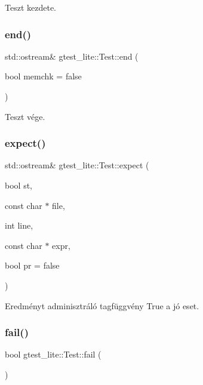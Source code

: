 Teszt kezdete. 

\mbox{\label{structgtest__lite_1_1_test_a658c1eee35f170294c354ebf4d3fc1ba}} 
\subsubsection{end()}
{\footnotesize\ttfamily std\+::ostream\& gtest\+\_\+lite\+::\+Test\+::end (\begin{DoxyParamCaption}\item[{bool}]{memchk = {\ttfamily false} }\end{DoxyParamCaption})\hspace{0.3cm}{\ttfamily [inline]}}



Teszt vége. 

\mbox{\label{structgtest__lite_1_1_test_a0bca03315e5963f7fdfffd92d2daed6a}} 
\subsubsection{expect()}
{\footnotesize\ttfamily std\+::ostream\& gtest\+\_\+lite\+::\+Test\+::expect (\begin{DoxyParamCaption}\item[{bool}]{st,  }\item[{const char $\ast$}]{file,  }\item[{int}]{line,  }\item[{const char $\ast$}]{expr,  }\item[{bool}]{pr = {\ttfamily false} }\end{DoxyParamCaption})\hspace{0.3cm}{\ttfamily [inline]}}



Eredményt adminisztráló tagfüggvény True a jó eset. 

\mbox{\label{structgtest__lite_1_1_test_aadbfd0f53c56d975f793602996631195}} 
\subsubsection{fail()}
{\footnotesize\ttfamily bool gtest\+\_\+lite\+::\+Test\+::fail (\begin{DoxyParamCaption}{ }\end{DoxyParamCaption})\hspace{0.3cm}{\ttfamily [inline]}}



